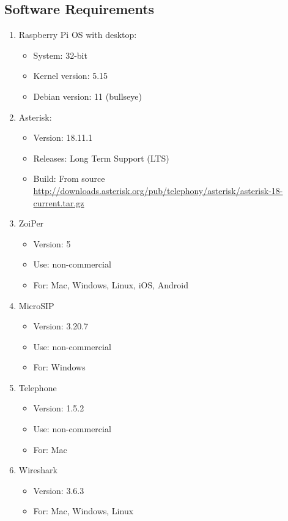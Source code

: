 	\subsection{Software Requirements}	\label{subsec:software}
		\begin{enumerate}
			\item Raspberry Pi OS with desktop: 
				\begin{itemize}
					\item System: 32-bit
					\item Kernel version: 5.15
					\item  Debian version: 11 (bullseye)
				\end{itemize}
			\item Asterisk:
				\begin{itemize}
					\item Version: 18.11.1
					\item Releases: Long Term Support (LTS)
					\item Build: From source \url{http://downloads.asterisk.org/pub/telephony/asterisk/asterisk-18-current.tar.gz}
				\end{itemize}
			\item ZoiPer
				\begin{itemize}
					\item Version: 5
					\item Use: non-commercial 
					\item For: Mac, Windows, Linux, iOS, Android
				\end{itemize}
			\item MicroSIP
				\begin{itemize}
					\item Version: 3.20.7
					\item Use: non-commercial 
					\item For: Windows
				\end{itemize}
			\item Telephone
				\begin{itemize}
					\item Version: 1.5.2
					\item Use: non-commercial 
					\item For: Mac
				\end{itemize}
			\item Wireshark
				\begin{itemize}
					\item Version: 3.6.3
					\item For: Mac, Windows, Linux
				\end{itemize}
		\end{enumerate}
